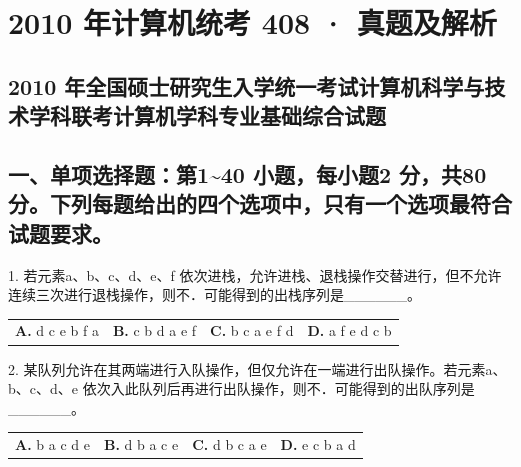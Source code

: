 \documentclass[UTF8,11pt]{ctexart}
\begin{document}
\section*{2010 年计算机统考 408 · 真题及解析}
\subsection*{2010 年全国硕士研究生入学统一考试计算机科学与技术学科联考计算机学科专业基础综合试题}

\subsection*{一、单项选择题：第1\textasciitilde{}40 小题，每小题2 分，共80 分。下列每题给出的四个选项中，只有一个选项最符合试题要求。}

1. 若元素a、b、c、d、e、f 依次进栈，允许进栈、退栈操作交替进行，但不允许连续三次进行退栈操作，则不．可能得到的出栈序列是\_\_\_\_\_\_。


\begin{center}\begin{tabular}{>{\raggedright\arraybackslash}p{\dimexpr(\linewidth-8\tabcolsep)/4\relax}>{\raggedright\arraybackslash}p{\dimexpr(\linewidth-8\tabcolsep)/4\relax}>{\raggedright\arraybackslash}p{\dimexpr(\linewidth-8\tabcolsep)/4\relax}>{\raggedright\arraybackslash}p{\dimexpr(\linewidth-8\tabcolsep)/4\relax}}
\textbf{A.} d c e b f a & \textbf{B.} c b d a e f & \textbf{C.} b c a e f d & \textbf{D.} a f e d c b\\[.35em]\end{tabular}\end{center}

2. 某队列允许在其两端进行入队操作，但仅允许在一端进行出队操作。若元素a、b、c、d、e 依次入此队列后再进行出队操作，则不．可能得到的出队序列是\_\_\_\_\_\_。


\begin{center}\begin{tabular}{>{\raggedright\arraybackslash}p{\dimexpr(\linewidth-8\tabcolsep)/4\relax}>{\raggedright\arraybackslash}p{\dimexpr(\linewidth-8\tabcolsep)/4\relax}>{\raggedright\arraybackslash}p{\dimexpr(\linewidth-8\tabcolsep)/4\relax}>{\raggedright\arraybackslash}p{\dimexpr(\linewidth-8\tabcolsep)/4\relax}}
\textbf{A.} b a c d e & \textbf{B.} d b a c e & \textbf{C.} d b c a e & \textbf{D.} e c b a d\\[.35em]\end{tabular}\end{center}
\end{document}
